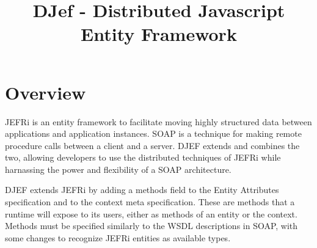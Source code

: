 \documentclass{article}
\begin{document}
\title{DJef - Distributed Javascript Entity Framework}
\maketitle
\tableofcontents
\newpage
\linespread{1.6}

\section{Overview}
JEFRi is an entity framework to facilitate moving highly structured data
between applications and application instances. SOAP is a technique for making
remote procedure calls between a client and a server. DJEF extends and
combines the two, allowing developers to use the distributed techniques of JEFRi
while harnassing the power and flexibility of a SOAP architecture.

DJEF extends JEFRi by adding a methods field to the Entity Attributes
specification and to the context meta specification. These are methods that a
runtime will expose to its users, either as methods of an entity or the context.
Methods must be specified similarly to the WSDL descriptions in SOAP, with some
changes to recognize JEFRi entities as available types.
\end{document}
